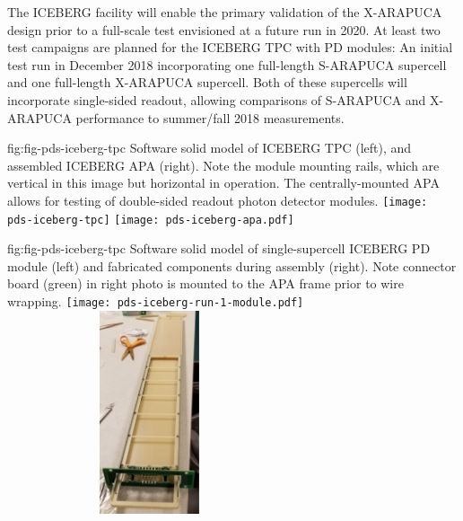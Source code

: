 
The ICEBERG facility will enable the primary validation of the X-ARAPUCA design prior to a full-scale test envisioned at a future  run in 2020. 
At least two test campaigns are planned for the ICEBERG TPC with PD modules:  An initial test run in December 2018 incorporating one full-length S-ARAPUCA supercell and one full-length X-ARAPUCA supercell.  Both of these supercells will incorporate single-sided readout, allowing comparisons of S-ARAPUCA and X-ARAPUCA performance to summer/fall 2018  measurements.


 \begin{dunefigure}
 {fig:fig-pds-iceberg-tpc}
 {Software solid model of ICEBERG TPC (left), and assembled ICEBERG APA (right).  Note the  module mounting rails, which are vertical in this image but horizontal in operation. The centrally-mounted APA allows for testing of double-sided readout photon detector modules.}
\texttt{[image: pds-iceberg-tpc]}
\texttt{[image: pds-iceberg-apa.pdf]}
\end{dunefigure}



\begin{dunefigure}
 {fig:fig-pds-iceberg-tpc}
 {Software solid model of single-supercell ICEBERG PD module (left) and fabricated components during assembly (right).  Note connector board (green) in right photo is mounted to the APA frame prior to wire wrapping.}
\texttt{[image: pds-iceberg-run-1-module.pdf]}
\includegraphics[angle=0,width=8.4cm,height=6cm]{graphics/pds-iceberg-module-assembly-photo.pdf}
\end{dunefigure}

